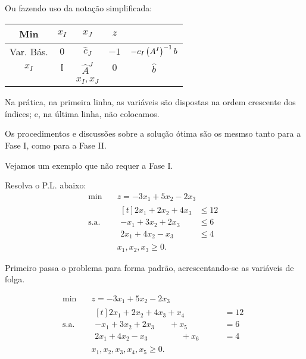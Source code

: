 Ou fazendo uso da notação simplificada:

\begin{table}[!htbp]
  \centering
  \begin{tabular}{c|ccc|c}
    Min       & $x_I$        & $x_J$           & $z$  & \\ \hline
    Var. Bás. & $0$          & $\widehat{c}_J$ & $-1$ & $-c_I \left(A^{I}\right)^{-1} b$ \\ \hline
    $x_I$     & $\mathbb{I}$ & $\widehat{A}^J$ & $0$  & $\widehat{b}$ \\ \hline
              &              & $x_I, x_J$      &      &
  \end{tabular}
\end{table}

Na prática, na primeira linha, as variáveis são dispostas na ordem crescente dos
índices; e, na última linha, não colocamos.

Os procedimentos e discussões sobre a solução ótima são os mesmso tanto para a 
Fase I, como para a Fase II.

Vejamos um exemplo que não requer a Fase I.

\begin{exemplo}
  Resolva o P.L. abaixo:
  \begin{align*}
    \min        \quad & z = -3 x_1 + 5 x_2 - 2 x_3 \\
    \text{s.a.} \quad & 
                        \begin{aligned}[t]
                          2 x_1 + 2 x_2 + 4 x_3 &\leq 12 \\
                          - x_1 + 3 x_2 + 2 x_3 &\leq 6  \\
                          2 x_1 + 4 x_2 -   x_3 &\leq 4
                        \end{aligned}\\
                      & x_1, x_2, x_3 \geq 0.
  \end{align*}
\end{exemplo}

Primeiro passa o problema para forma padrão, acrescentando-se as variáveis de 
folga.

\begin{align*}
  \min        \quad & z = -3 x_1 + 5 x_2 - 2 x_3 \\
  \text{s.a.} \quad & 
                      \begin{aligned}[t]
                        2 x_1 + 2 x_2 + 4 x_3 + x_4 \phantom{+ x_5 + x_6} &= 12 \\
                        - x_1 + 3 x_2 + 2 x_3 \phantom{+ x_4} + x_5 \phantom{+ x_6}&= 6  \\
                        2 x_1 + 4 x_2 -   x_3 \phantom{+ x_4 + x_5} + x_6 &= 4
                      \end{aligned}\\
                    & x_1, x_2, x_3, x_4, x_5 \geq 0.
\end{align*}

